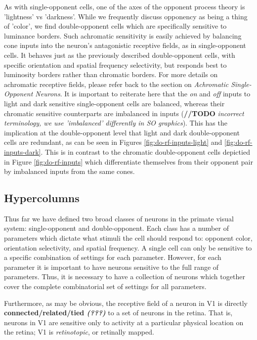 \documentclass[journal,onecolumn]{IEEEtran}
\begin{document}
As with single-opponent cells, one of the axes of the opponent process theory is 'lightness' vs 'darkness'. While we frequently discuss opponency as being a thing of 'color', we find double-opponent cells which are specifically sensitive to luminance borders.
Such achromatic sensitivity is easily achieved by balancing cone inputs into the neuron's antagonistic receptive fields, as in single-opponent cells. It behaves just as the previously described double-opponent cells, with specific orientation and spatial frequency selectivity, but responds best to luminosity borders rather than chromatic borders. For more details on achromatic receptive fields, please refer back to the section on \textit{Achromatic Single-Opponent Neurons}.
It is important to reiterate here that the \textit{on} and \textit{off} inputs to light and dark sensitive single-opponent cells are balanced, whereas their chromatic sensitive counterparts are imbalanced in inputs (\textbf{//TODO} \textit{incorrect terminology, we use 'imbalanced' differently in SO graphics}). This has the implication at the double-opponent level that light and dark double-opponent cells are redundant, as can be seen in Figures \ref{fig:do-rf-inputs-light} and \ref{fig:do-rf-inputs-dark}. This is in contrast to the chromatic double-opponent cells depictied in Figure \ref{fig:do-rf-inputs} which differentiate themselves from their opponent pair by imbalanced inputs from the same cones.


\subsection*{Hypercolumns}

Thus far we have defined two broad classes of neurons in the primate visual system: single-opponent and double-opponent. Each class has a number of parameters which dictate what stimuli the cell should respond to: opponent color, orientation selectivity, and spatial frequency. A single cell can only be sensitive to a specific combination of settings for each parameter. However, for each parameter it is important to have neurons sensitive to the full range of parameters. Thus, it is necessary to have a collection of neurons which together cover the complete combinatorial set of settings for all parameters.

Furthermore, as may be obvious, the receptive field of a neuron in V1 is directly \textbf{connected/related/tied \textit{(???)}} to a set of neurons in the retina. That is, neurons in V1 are sensitive only to activity at a particular physical location on the retina; V1 is \textit{retinotopic}, or retinally mapped.
\end{document}
